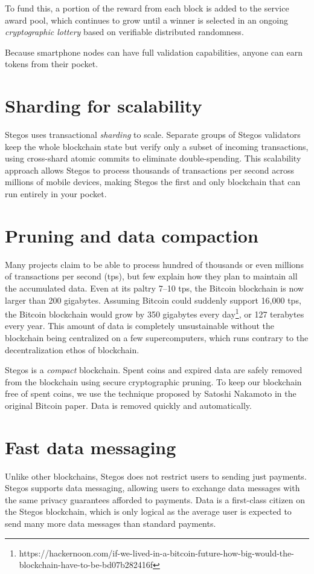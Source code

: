 \documentclass[8pt,fleqn,openany]{book}
\begin{document}
To fund this, a portion of the reward from each block is added to the service award pool, which continues to grow until a winner is selected in an ongoing \textit{cryptographic lottery} based on verifiable distributed randomness. 

Because smartphone nodes can have full validation capabilities, anyone can earn tokens from their pocket.

\section{Sharding for scalability}
Stegos uses transactional \textit{sharding} to scale. Separate groups of Stegos validators keep the whole blockchain state but verify only a subset of incoming transactions, using cross-shard atomic commits to eliminate double-spending. This scalability approach allows Stegos to process thousands of transactions per second across millions of mobile devices, making Stegos the first and only blockchain that can run entirely in your pocket. 

\section{Pruning and data compaction}
Many projects claim to be able to process hundred of thousands or even millions of transactions per second (tps), but few explain how they plan to maintain all the accumulated data. Even at its paltry 7--10 tps, the Bitcoin blockchain is now larger than 200 gigabytes. Assuming Bitcoin could suddenly support 16,000 tps, the Bitcoin blockchain would grow by 350 gigabytes every day\footnote{https://hackernoon.com/if-we-lived-in-a-bitcoin-future-how-big-would-the-blockchain-have-to-be-bd07b282416f}, or 127 terabytes every year. This amount of data is completely unsustainable without the blockchain being centralized on a few supercomputers, which runs contrary to the decentralization ethos of blockchain.

Stegos is a \textit{compact} blockchain. Spent coins and expired data are safely removed from the blockchain using secure cryptographic pruning. To keep our blockchain free of spent coins, we use the technique proposed by Satoshi Nakamoto in the original Bitcoin paper\cite{c1}. Data is removed quickly and automatically.

\section{Fast data messaging}
Unlike other blockchains, Stegos does not restrict users to sending just payments. Stegos supports data messaging, allowing users to exchange data messages with the same privacy guarantees afforded to payments. Data is a first-class citizen on the Stegos blockchain, which is only logical as the average user is expected to send many more data messages than standard payments.
\end{document}
